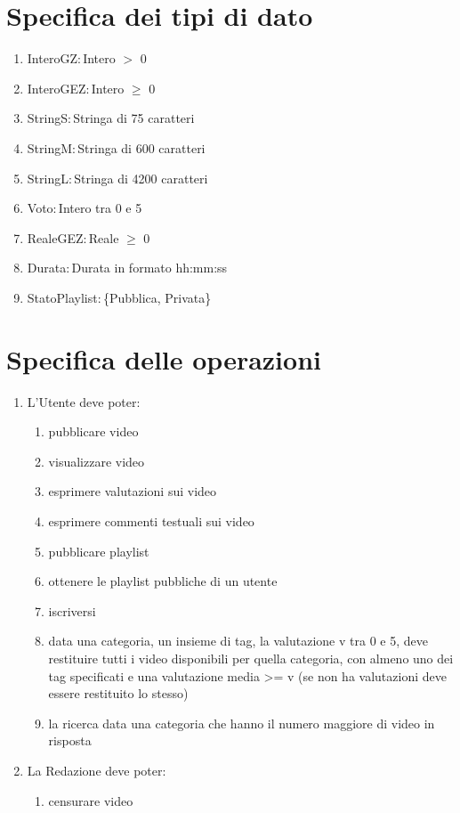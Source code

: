 \documentclass{article}
\begin{document}
\newpage

\section{\label{sec:TipoDiDato}Specifica dei tipi di dato}
\begin{enumerate}
    \item\label{sec:TipoInteroGZ} InteroGZ$: $Intero $>$ 0
    \item\label{sec:TipoInteroGEZ} InteroGEZ$: $Intero $\geq$ 0
    \item\label{sec:TipoStringS} StringS$: $Stringa di 75 caratteri
    \item\label{sec:TipoStringM} StringM$: $Stringa di 600 caratteri
    \item\label{sec:TipoStringL} StringL$: $Stringa di 4200 caratteri
    \item\label{sec:TipoVoto} Voto$: $Intero tra 0 e 5
    \item\label{sec:TipoRealeGEZ} RealeGEZ$: $Reale $\geq$ 0
    \item\label{sec:TipoDurata} Durata$: $Durata in formato hh:mm:ss
    \item\label{sec:TipoStatoPlaylist} StatoPlaylist$: $\{Pubblica, Privata\}
\end{enumerate}

\newpage

\section{\label{sec:Operazioni}Specifica delle operazioni}

\begin{enumerate}
    \item\label{sec:OperazioniUtente} L'Utente deve poter:
    \begin{enumerate}
        \item pubblicare video
        \item visualizzare video
        \item esprimere valutazioni sui video
        \item esprimere commenti testuali sui video
        \item pubblicare playlist
        \item ottenere le playlist pubbliche di un utente
        \item iscriversi
        \item data una categoria, un insieme di tag, la valutazione v tra 0 e 5, deve restituire tutti i video disponibili per quella categoria, con almeno uno dei tag specificati e una valutazione media >= v (se non ha valutazioni deve essere restituito lo stesso)
        \item la ricerca data una categoria che hanno il numero maggiore di video in risposta
    \end{enumerate}
    \item\label{sec:OperazioniRedazione} La Redazione deve poter:
    \begin{enumerate}
        \item censurare video
    \end{enumerate}
\end{enumerate}
\end{document}
